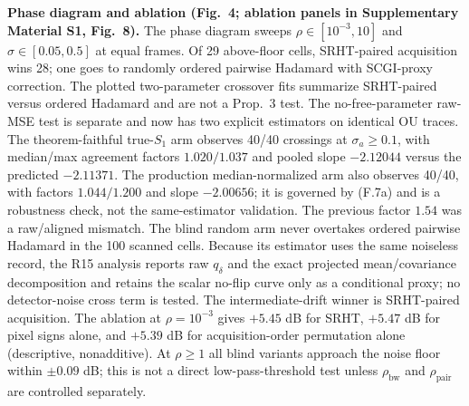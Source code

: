 \noindent\textbf{Phase diagram and ablation (Fig.~4; ablation panels in Supplementary Material S1, Fig.~8).} The phase diagram sweeps $\rho\in[10^{-3},10]$ and $\sigma\in[0.05,0.5]$ at equal frames. Of 29 above-floor cells, SRHT-paired acquisition wins 28; one goes to randomly ordered pairwise Hadamard with SCGI-proxy correction. The plotted two-parameter crossover fits summarize SRHT-paired versus ordered Hadamard and are not a Prop.~3 test. The no-free-parameter raw-MSE test is separate and now has two explicit estimators on identical OU traces. The theorem-faithful true-$S_1$ arm observes 40/40 crossings at $\sigma_a\ge0.1$, with median/max agreement factors $1.020/1.037$ and pooled slope $-2.12044$ versus the predicted $-2.11371$. The production median-normalized arm also observes 40/40, with factors $1.044/1.200$ and slope $-2.00656$; it is governed by (F.7a) and is a robustness check, not the same-estimator validation. The previous factor $1.54$ was a raw/aligned mismatch. The blind random arm never overtakes ordered pairwise Hadamard in the 100 scanned cells. Because its estimator uses the same noiseless record, the R15 analysis reports raw $q_\delta$ and the exact projected mean/covariance decomposition and retains the scalar no-flip curve only as a conditional proxy; no detector-noise cross term is tested. The intermediate-drift winner is SRHT-paired acquisition. The ablation at $\rho=10^{-3}$ gives $+5.45$ dB for SRHT, $+5.47$ dB for pixel signs alone, and $+5.39$ dB for acquisition-order permutation alone (descriptive, nonadditive). At $\rho\ge1$ all blind variants approach the noise floor within $\pm0.09$ dB; this is not a direct low-pass-threshold test unless $\rho_{\mathrm{bw}}$ and $\rho_{\mathrm{pair}}$ are controlled separately.

